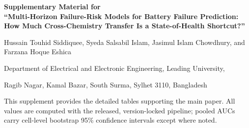 \documentclass[11pt,a4paper]{article}
\begin{document}
\begin{center}
  {\LARGE\bfseries Supplementary Material for\\[4pt]
   ``Multi-Horizon Failure-Risk Models for Battery Failure Prediction:
   How Much Cross-Chemistry Transfer Is a State-of-Health Shortcut?''\par}
  \vspace{1.2em}
  {\normalsize Hussain Touhid Siddiquee,
   Syeda Salsabil Islam,
   Jasimul Islam Chowdhury, and
   Farzana Hoque Eshica\par}
  \vspace{0.7em}
  {\small Department of Electrical and Electronic Engineering, Leading University,\par
   Ragib Nagar, Kamal Bazar, South Surma, Sylhet 3110, Bangladesh\par}
\end{center}

\vspace{1.2em}

\noindent
This supplement provides the detailed tables supporting the main paper. All values are computed with the released, version-locked pipeline; pooled AUCs carry cell-level bootstrap 95\% confidence intervals except where noted.
\end{document}
